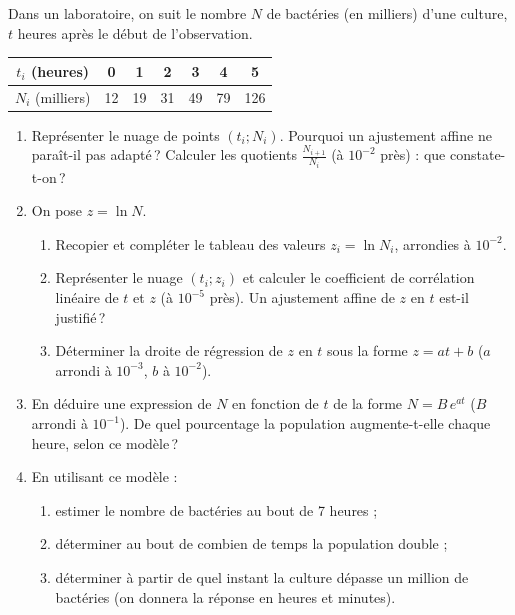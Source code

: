      \begin{exo}
            \label{exo:stat8}
            Dans un laboratoire, on suit le nombre $N$ de bact\'eries (en milliers) d'une culture, 
            $t$ heures apr\`es le d\'ebut de l'observation.
            \begin{center}
            \begin{tabular}{|c|c|c|c|c|c|c|}
                  \hline
                  $t_i$ (heures) & 0 & 1 & 2 & 3 & 4 & 5 \\
                  \hline
                  $N_i$ (milliers) & 12 & 19 & 31 & 49 & 79 & 126 \\
                  \hline
            \end{tabular}
            \end{center}
            \begin{enumerate}
                  \item Repr\'esenter le nuage de points $(t_i ; N_i)$. Pourquoi un ajustement affine ne para\^it-il pas adapt\'e\,?
                        Calculer les quotients $\frac{N_{i+1}}{N_i}$ (\`a $10^{-2}$ pr\`es) : que constate-t-on\,?
                  \item On pose $z = \ln N$.
                        \begin{enumerate}
                        \item Recopier et compl\'eter le tableau des valeurs $z_i = \ln N_i$, arrondies \`a $10^{-2}$.
                        \item Repr\'esenter le nuage $(t_i ; z_i)$ et calculer le coefficient de corr\'elation lin\'eaire 
                              de $t$ et $z$ (\`a $10^{-5}$ pr\`es). Un ajustement affine de $z$ en $t$ est-il justifi\'e\,?
                        \item D\'eterminer la droite de r\'egression de $z$ en $t$ sous la forme $z = a t + b$ 
                              ($a$ arrondi \`a $10^{-3}$, $b$ \`a $10^{-2}$).
                        \end{enumerate}
                  \item En d\'eduire une expression de $N$ en fonction de $t$ de la forme $N = B\, e^{at}$ ($B$ arrondi \`a $10^{-1}$).
                        De quel pourcentage la population augmente-t-elle chaque heure, selon ce mod\`ele\,?
                  \item En utilisant ce mod\`ele :
                        \begin{enumerate}
                        \item estimer le nombre de bact\'eries au bout de 7 heures ;
                        \item d\'eterminer au bout de combien de temps la population double ;
                        \item d\'eterminer \`a partir de quel instant la culture d\'epasse un million de bact\'eries
                              (on donnera la r\'eponse en heures et minutes).
                        \end{enumerate}
            \end{enumerate}
      \end{exo}

